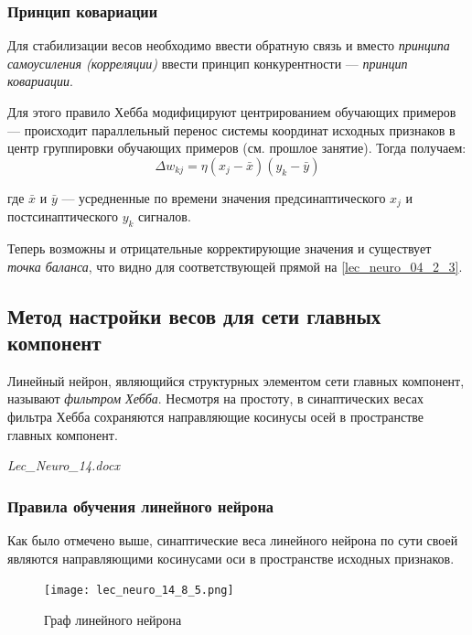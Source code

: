 \documentclass{article}
\numberwithin{equation}{subsection}
\begin{document}
\subsubsection{Принцип ковариации}

Для стабилизации весов необходимо ввести обратную связь и вместо \textit{принципа 
самоусиления (корреляции)} ввести принцип конкурентности --- \textit{принцип ковариации}.

Для этого правило Хебба модифицируют центрированием обучающих примеров --- происходит параллельный 
перенос системы координат исходных признаков в центр группировки обучающих примеров 
(см. прошлое занятие). Тогда получаем:
\begin{equation}
    \Delta w_{kj} = \eta \left( x_j - \bar{x} \right) \left( y_k - \bar{y} \right)
\end{equation}

\noindent
где $\bar{x}$ и $\bar{y}$ --- усредненные по времени значения предсинаптического $x_j$ 
и постсинаптического $y_k$ сигналов.

Теперь возможны и отрицательные корректирующие значения и существует \textit{точка баланса},
что видно для соответствующей прямой на \ref{lec_neuro_04_2_3}. 




\subsection{Метод настройки весов для сети главных компонент}

Линейный нейрон, являющийся структурных элементом сети главных компонент, называют 
\textit{фильтром Хебба}.
Несмотря на простоту, в синаптических весах фильтра Хебба сохраняются 
направляющие косинусы осей в пространстве главных компонент.

\begin{myquote}
    \textit{Lec\_Neuro\_14.docx}
\end{myquote}



\subsubsection{Правила обучения линейного нейрона}

Как было отмечено выше, синаптические веса линейного нейрона по сути своей являются 
направляющими косинусами оси в пространстве исходных признаков.

\begin{figure}[htbp]
    \centering
    \texttt{[image: lec\_neuro\_14\_8\_5.png]}
    \caption{Граф линейного нейрона}
    \label{lec_neuro_14_8_5}
\end{figure}
\end{document}
